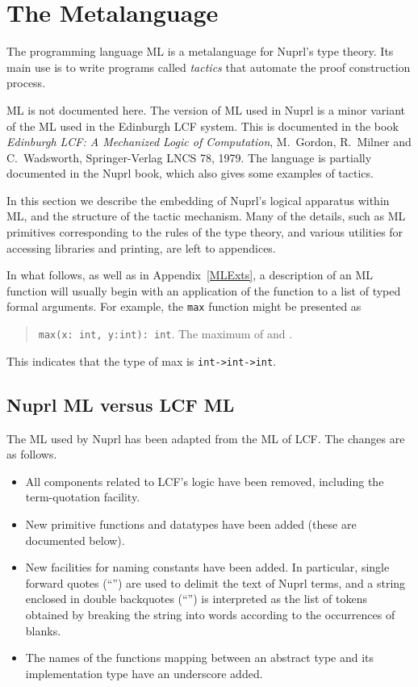 \chapter{The Metalanguage}

\label{ML}

The programming language ML is a metalanguage for Nuprl's type
theory.  Its main use is to write programs called {\em tactics} that
automate the proof construction process.  

ML is not documented here.  The version of ML used in Nuprl is a minor
variant of
the ML used in the Edinburgh LCF system.  This is documented in the book
{\em Edinburgh LCF: A Mechanized Logic of Computation}, M.\ Gordon, R.\
Milner and C.\ Wadsworth, Springer-Verlag LNCS 78, 1979.  The language is
partially documented in the Nuprl book, which also gives some examples of
tactics.

In this section we describe the embedding of Nuprl's logical apparatus
within ML, and the structure of the tactic mechanism.  Many of the
details, such as ML primitives corresponding to the rules of the type
theory, and various utilities for accessing libraries and printing, are
left to appendices.

In what follows, as well as in Appendix~\ref{MLExts},
a description of an ML 
function will usually begin with an application of the
function to a list of typed
formal arguments.  For example, the {\tt max} function might be presented
as
\begin{quote}
{\tt max(x: int, y:int): int}.  \rm The maximum of  and .
\end{quote}
This indicates that the type of max is {\tt int->int->int}. 

\section{Nuprl ML versus LCF ML}

The ML used by Nuprl has been adapted from the ML of LCF.  The changes are
as follows.
\begin{itemize}

\item All components related to LCF's logic have been removed, including
the term-quotation facility.  

\item New primitive functions and datatypes have been added (these are
documented below).  

\item New facilities for naming constants have been added.  In particular,
single forward quotes (``\tid{'}'') are used to delimit the text of Nuprl
terms, and a string enclosed in double backquotes (``\tid{`}'') is
interpreted as the list of tokens obtained by breaking the string into
words according to the occurrences of blanks.

\item The names of the functions mapping between an abstract type and its
implementation type have an underscore added.

\end{itemize}


